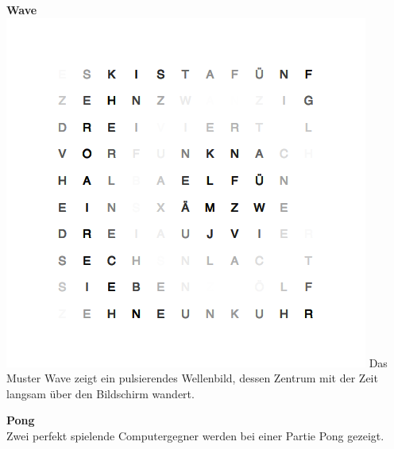 \begin{multicols}{2}
\textbf{Wave} \\
\includegraphics[width=\columnwidth]{Abbildungen/Software/Demo/Welle}
Das Muster Wave zeigt ein pulsierendes Wellenbild, dessen Zentrum mit der Zeit langsam über den Bildschirm wandert.

\textbf{Pong} \\
Zwei perfekt spielende Computergegner werden bei einer Partie Pong gezeigt.


\end{multicols}

